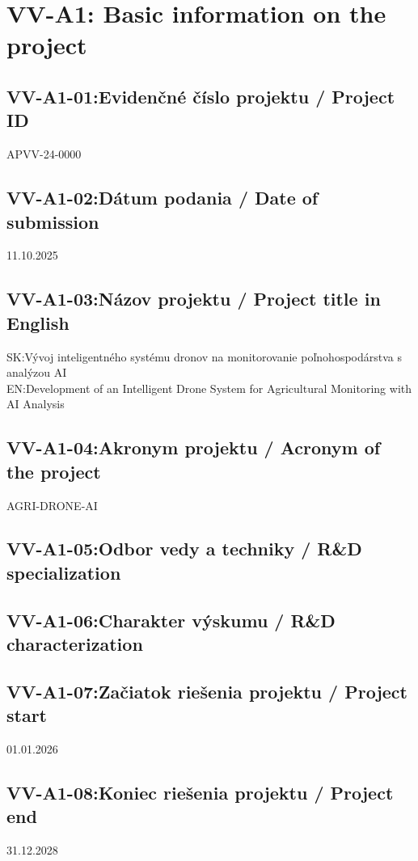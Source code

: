 \section*{VV-A1: Basic information on the project}
    
\subsection*{VV-A1-01:Evidenčné číslo projektu / Project ID }
APVV-24-0000
\subsection*{VV-A1-02:Dátum podania / Date of submission }
11.10.2025
\subsection*{VV-A1-03:Názov projektu / Project title in English }
    SK:Vývoj inteligentného systému dronov na monitorovanie poľnohospodárstva s analýzou AI \\
    EN:Development of an Intelligent Drone System for Agricultural Monitoring with AI Analysis
\subsection*{VV-A1-04:Akronym projektu / Acronym of the project }
    AGRI-DRONE-AI
\subsection*{VV-A1-05:Odbor vedy a techniky / R\&D specialization}

\subsection*{VV-A1-06:Charakter výskumu / R\&D characterization }
\subsection*{VV-A1-07:Začiatok riešenia projektu / Project start }
01.01.2026
\subsection*{VV-A1-08:Koniec riešenia projektu / Project end }
31.12.2028
